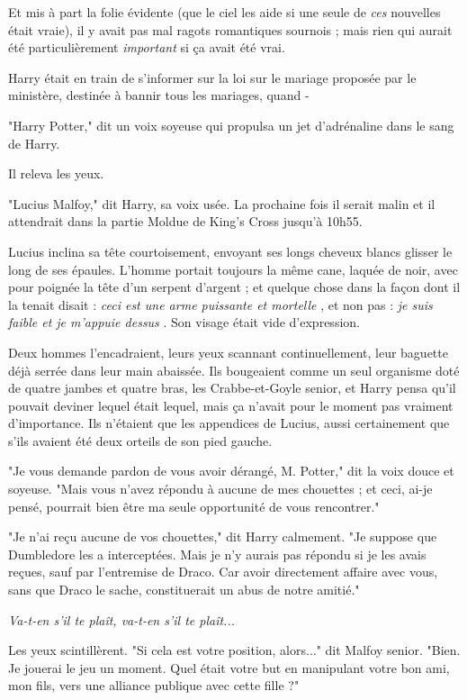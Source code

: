 Et mis à part la folie évidente (que le ciel les aide si une seule de \emph{ces}  nouvelles était vraie), il y avait pas mal ragots romantiques sournois ; mais rien qui aurait été particulièrement \emph{important}  si ça avait été vrai.

Harry était en train de s'informer sur la loi sur le mariage proposée par le ministère, destinée à bannir tous les mariages, quand -

"Harry Potter," dit un voix soyeuse qui propulsa un jet d'adrénaline dans le sang de Harry.

Il releva les yeux.

"Lucius Malfoy," dit Harry, sa voix usée. La prochaine fois il serait malin et il attendrait dans la partie Moldue de King's Cross jusqu'à 10h55.

Lucius inclina sa tête courtoisement, envoyant ses longs cheveux blancs glisser le long de ses épaules. L'homme portait toujours la même cane, laquée de noir, avec pour poignée la tête d'un serpent d'argent ; et quelque chose dans la façon dont il la tenait disait : \emph{ceci est une arme puissante et mortelle} , et non pas : \emph{je suis faible et je m'appuie dessus} . Son visage était vide d'expression.

Deux hommes l'encadraient, leurs yeux scannant continuellement, leur baguette déjà serrée dans leur main abaissée. Ils bougeaient comme un seul organisme doté de quatre jambes et quatre bras, les Crabbe-et-Goyle senior, et Harry pensa qu'il pouvait deviner lequel était lequel, mais ça n'avait pour le moment pas vraiment d'importance. Ils n'étaient que les appendices de Lucius, aussi certainement que s'ils avaient été deux orteils de son pied gauche.

"Je vous demande pardon de vous avoir dérangé, M. Potter," dit la voix douce et soyeuse. "Mais vous n'avez répondu à aucune de mes chouettes ; et ceci, ai-je pensé, pourrait bien être ma seule opportunité de vous rencontrer."

"Je n'ai reçu aucune de vos chouettes," dit Harry calmement. "Je suppose que Dumbledore les a interceptées. Mais je n'y aurais pas répondu si je les avais reçues, sauf par l'entremise de Draco. Car avoir directement affaire avec vous, sans que Draco le sache, constituerait un abus de notre amitié."

\emph{Va-t-en s'il te plaît, va-t-en s'il te plaît...} 

Les yeux scintillèrent. "Si cela est votre position, alors..." dit Malfoy senior. "Bien. Je jouerai le jeu un moment. Quel était votre but en manipulant votre bon ami, mon fils, vers une alliance publique avec cette fille ?"

